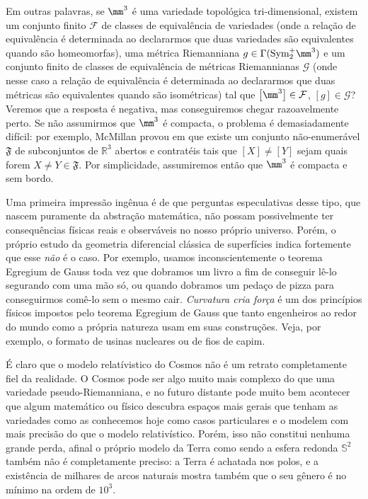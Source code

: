  \par Em outras palavras, se $\mm^3$ é uma variedade topológica tri-dimensional, existem um conjunto finito $\mathcal{F}$  de classes de equivalência de variedades (onde a relação de equivalência é determinada ao declararmos que duas variedades são equivalentes quando são homeomorfas), uma métrica Riemanniana $g \in \Gamma(\text{Sym}_2^{+} \mm^3)$ e um conjunto finito de classes de equivalência de métricas Riemannianas $\mathcal{G}$ (onde nesse caso a relação de equivalência é determinada ao declararmos que duas métricas são equivalentes quando são isométricas) tal que $\left[\mm^3 \right] \in \mathcal{F}$, $[g] \in \mathcal{G}$? Veremos que a resposta é negativa, mas conseguiremos chegar razoavelmente perto. Se não assumirmos que $\mm^3$ é compacta, o problema é demasiadamente difícil: por exemplo, McMillan provou em  que existe um conjunto não-enumerável $\mathfrak{F}$ de subconjuntos de $\mathbb{R}^3$ abertos e contratéis tais que $[X] \neq [Y]$ sejam quais forem $X \neq Y \in \mathfrak{F}$. Por simplicidade, assumiremos então que $\mm^3$ é compacta e sem bordo.  \par
 Uma primeira impressão ingênua é de que perguntas especulativas desse tipo, que nascem puramente da abstração matemática, não possam possivelmente ter consequências físicas reais e observáveis no nosso próprio universo. Porém, o próprio estudo da geometria diferencial clássica de superfícies indica fortemente que esse \emph{não} é o caso. Por exemplo, usamos inconscientemente o teorema Egregium de Gauss toda vez que dobramos um livro a fim de conseguir lê-lo segurando com uma mão só, ou quando dobramos um pedaço de pizza para conseguirmos comê-lo sem o mesmo cair. \emph{Curvatura cria força} é um dos princípios físicos impostos pelo teorema Egregium de Gauss que tanto engenheiros ao redor do mundo como a própria natureza usam em suas construções. Veja, por exemplo, o formato de usinas nucleares ou de fios de capim.  \par
É claro que o modelo relatívistico do Cosmos não é um retrato completamente fiel da realidade. O Cosmos pode ser algo muito mais complexo do que uma variedade pseudo-Riemanniana, e no futuro distante pode muito bem acontecer que algum matemático ou físico descubra espaços mais gerais que tenham as variedades como as conhecemos hoje como casos particulares e o modelem com mais precisão do que o modelo relativístico. Porém, isso não constitui nenhuma grande perda, afinal o próprio modelo da Terra como sendo a esfera redonda $\mathbb{S}^2$ também não é completamente preciso: a Terra é achatada nos polos, e a existência de milhares de arcos naturais mostra também que o seu gênero é no mínimo na ordem de $10^3$.\par
